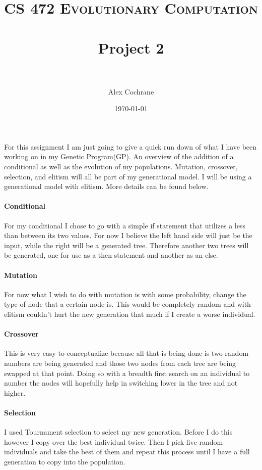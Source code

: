 \documentclass[paper=a4, fontsize=11pt]{scrartcl} %
\title{	
\normalfont \normalsize 
\textsc{CS 472 Evolutionary Computation} \\ [25pt] %
\horrule{0.5pt} \\[0.4cm] %
\huge Project 2 \\ %
\horrule{2pt} \\[0.5cm] %
}
\author{Alex Cochrane} %
\date{\normalsize\today} %
\numberwithin{equation}{section} %
\numberwithin{figure}{section} %
\numberwithin{table}{section} %
\begin{document}
\maketitle %


\paragraph{} For this assignment I am just going to give  a quick run down of what I have been working on in my Genetic Program(GP). An overview of the addition of a conditional as well as the evolution of my populations. Mutation, crossover, selection, and elitism will all be part of my generational model. I will be using a generational model with elitism. More details can be found below.

\paragraph{Conditional} For my conditional I chose to go with a simple if statement that utilizes a less than between its two values. For now I believe the left hand side will just be the input, while the right will be a generated tree. Therefore another two trees will be generated, one for use as a then statement and another as an else.

\paragraph{Mutation} For now what I wish to do with mutation is with some probability, change the type of node that a certain node is. This would be completely random and with elitism couldn't hurt the new generation that much if I create a worse individual.

\paragraph{Crossover} This is very easy to conceptualize because all that is being done is two random numbers are being generated and those two nodes from each tree are being swapped at that point. Doing so with a breadth first search on an individual to number the nodes will hopefully help in switching lower in the tree and not higher.

\paragraph{Selection} I used Tournament selection to select my new generation. Before I do this however I copy over the best individual twice. Then I pick five random individuals and take the best of them and repeat this process until I have a full generation to copy into the population.
\end{document}
